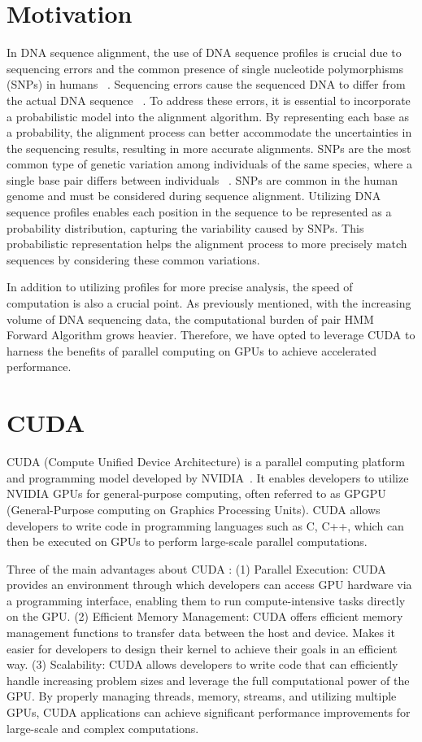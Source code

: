 \documentclass[PhD]{PHlab-thesis}
\begin{document}
\section{Motivation}
In DNA sequence alignment, the use of DNA sequence profiles is crucial due to sequencing errors and the common presence of single nucleotide polymorphisms (SNPs) in humans ~\cite{Xuhua,Dimitrios}. Sequencing errors cause the sequenced DNA to differ from the actual DNA sequence ~\cite{sequencingError}. To address these errors, it is essential to incorporate a probabilistic model into the alignment algorithm. By representing each base as a probability, the alignment process can better accommodate the uncertainties in the sequencing results, resulting in more accurate alignments. SNPs are the most common type of genetic variation among individuals of the same species, where a single base pair differs between individuals ~\cite{Xuhua}. SNPs are common in the human genome and must be considered during sequence alignment. Utilizing DNA sequence profiles enables each position in the sequence to be represented as a probability distribution, capturing the variability caused by SNPs. This probabilistic representation helps the alignment process to more precisely match sequences by considering these common variations.

In addition to utilizing profiles for more precise analysis, the speed of computation is also a crucial point. As previously mentioned, with the increasing volume of DNA sequencing data, the computational burden of pair HMM Forward Algorithm grows heavier. Therefore, we have opted to leverage CUDA to harness the benefits of parallel computing on GPUs to achieve accelerated performance.

\section{CUDA}
CUDA (Compute Unified Device Architecture) is a parallel computing platform and programming model developed by NVIDIA~\cite{CUDA}. It enables developers to utilize NVIDIA GPUs for general-purpose computing, often referred to as GPGPU (General-Purpose computing on Graphics Processing Units). CUDA allows developers to write code in programming languages such as C, C++, which can then be executed on GPUs to perform large-scale parallel computations.

Three of the main advantages about CUDA : (1) Parallel Execution: CUDA provides an environment through which developers can access GPU hardware via a programming interface, enabling them to run compute-intensive tasks directly on the GPU. (2) Efficient Memory Management: CUDA offers efficient memory management functions to transfer data between the host and device. Makes it easier for developers to design their kernel to achieve their goals in an efficient way. (3) Scalability: CUDA allows developers to write code that can efficiently handle increasing problem sizes and leverage the full computational power of the GPU. By properly managing threads, memory, streams, and utilizing multiple GPUs, CUDA applications can achieve significant performance improvements for large-scale and complex computations.  
\end{document}
